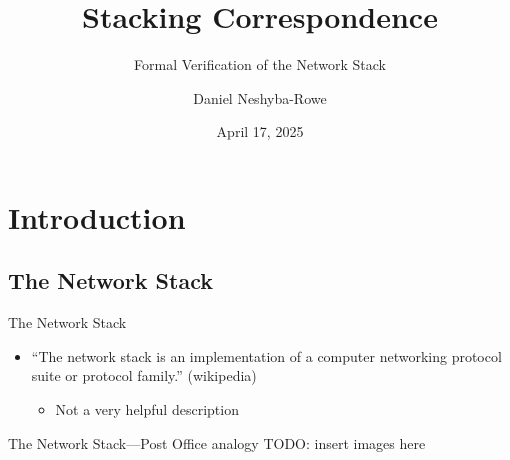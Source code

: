 \documentclass{beamer}
\title{Stacking Correspondence}
\subtitle{Formal Verification of the Network Stack}
\author{Daniel Neshyba-Rowe}
\institute{Lewis \& Clark College}
\date{April 17, 2025}
\begin{document}
\begin{frame}
\titlepage
\end{frame}


\section{Introduction}

\subsection{The Network Stack}
\begin{frame}{The Network Stack}
    

    \begin{itemize}
        \item<1-> ``The network stack is an implementation of a computer networking protocol suite or protocol family.'' (wikipedia)
        \begin{itemize}
            \item<2-> Not a very helpful description
        \end{itemize}
        
    \end{itemize}
    

\end{frame}

\begin{frame}{The Network Stack---Post Office analogy}
TODO: insert images here
\end{frame}
\end{document}
